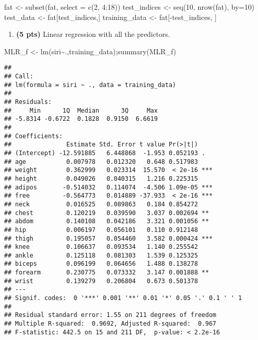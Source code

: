 \documentclass[
]{article}
\newenvironment{Shaded}{\begin{snugshade}}{\end{snugshade}}
\newcommand{\AttributeTok}[1]{\textcolor[rgb]{0.77,0.63,0.00}{#1}}
\newcommand{\DecValTok}[1]{\textcolor[rgb]{0.00,0.00,0.81}{#1}}
\newcommand{\FunctionTok}[1]{\textcolor[rgb]{0.00,0.00,0.00}{#1}}
\newcommand{\NormalTok}[1]{#1}
\newcommand{\OtherTok}[1]{\textcolor[rgb]{0.56,0.35,0.01}{#1}}
\newcommand{\SpecialCharTok}[1]{\textcolor[rgb]{0.00,0.00,0.00}{#1}}
\providecommand{\tightlist}{%
  \setlength{\itemsep}{0pt}\setlength{\parskip}{0pt}}
\begin{document}
\begin{Shaded}
\begin{Highlighting}[]
\NormalTok{fat }\OtherTok{\textless{}{-}} \FunctionTok{subset}\NormalTok{(fat, }\AttributeTok{select =} \FunctionTok{c}\NormalTok{(}\DecValTok{2}\NormalTok{, }\DecValTok{4}\SpecialCharTok{:}\DecValTok{18}\NormalTok{))}
\NormalTok{test\_indices }\OtherTok{\textless{}{-}} \FunctionTok{seq}\NormalTok{(}\DecValTok{10}\NormalTok{, }\FunctionTok{nrow}\NormalTok{(fat), }\AttributeTok{by=}\DecValTok{10}\NormalTok{)}
\NormalTok{test\_data }\OtherTok{\textless{}{-}}\NormalTok{ fat[test\_indices,] }
\NormalTok{training\_data }\OtherTok{\textless{}{-}}\NormalTok{ fat[}\SpecialCharTok{{-}}\NormalTok{test\_indices, ]}
\end{Highlighting}
\end{Shaded}

\begin{enumerate}
\def\labelenumi{(\alph{enumi})}
\tightlist
\item
  \textbf{(5 pts)} Linear regression with all the predictors.
\end{enumerate}

\begin{Shaded}
\begin{Highlighting}[]
\NormalTok{MLR\_f }\OtherTok{\textless{}{-}} \FunctionTok{lm}\NormalTok{(siri}\SpecialCharTok{\textasciitilde{}}\NormalTok{.,training\_data);}\FunctionTok{summary}\NormalTok{(MLR\_f)}
\end{Highlighting}
\end{Shaded}

\begin{verbatim}
## 
## Call:
## lm(formula = siri ~ ., data = training_data)
## 
## Residuals:
##     Min      1Q  Median      3Q     Max 
## -5.8314 -0.6722  0.1828  0.9150  6.6619 
## 
## Coefficients:
##               Estimate Std. Error t value Pr(>|t|)    
## (Intercept) -12.591885   6.448868  -1.953 0.052193 .  
## age           0.007978   0.012320   0.648 0.517983    
## weight        0.362999   0.023314  15.570  < 2e-16 ***
## height        0.049026   0.040315   1.216 0.225315    
## adipos       -0.514032   0.114074  -4.506 1.09e-05 ***
## free         -0.564773   0.014889 -37.933  < 2e-16 ***
## neck          0.016525   0.089863   0.184 0.854272    
## chest         0.120219   0.039590   3.037 0.002694 ** 
## abdom         0.140108   0.042186   3.321 0.001056 ** 
## hip           0.006197   0.056101   0.110 0.912148    
## thigh         0.195057   0.054460   3.582 0.000424 ***
## knee          0.106637   0.093534   1.140 0.255542    
## ankle         0.125118   0.081303   1.539 0.125325    
## biceps        0.096199   0.064656   1.488 0.138278    
## forearm       0.230775   0.073332   3.147 0.001888 ** 
## wrist         0.139279   0.206804   0.673 0.501378    
## ---
## Signif. codes:  0 '***' 0.001 '**' 0.01 '*' 0.05 '.' 0.1 ' ' 1
## 
## Residual standard error: 1.55 on 211 degrees of freedom
## Multiple R-squared:  0.9692, Adjusted R-squared:  0.967 
## F-statistic: 442.5 on 15 and 211 DF,  p-value: < 2.2e-16
\end{verbatim}
\end{document}
